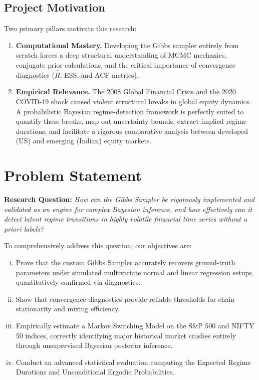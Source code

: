 \documentclass[12pt, a4paper]{article}
\begin{document}
\subsection{Project Motivation}
Two primary pillars motivate this research:
\begin{enumerate}
  \item \textbf{Computational Mastery.} Developing the Gibbs sampler entirely from scratch forces a deep structural understanding of MCMC mechanics, conjugate prior calculations, and the critical importance of convergence diagnostics ($\hat{R}$, ESS, and ACF metrics).
  \item \textbf{Empirical Relevance.} The 2008 Global Financial Crisis and the 2020 COVID-19 shock caused violent structural breaks in global equity dynamics. A probabilistic Bayesian regime-detection framework is perfectly suited to quantify these breaks, map out uncertainty bounds, extract implied regime durations, and facilitate a rigorous comparative analysis between developed (US) and emerging (Indian) equity markets.
\end{enumerate}


\section{Problem Statement}

\textbf{Research Question:} \emph{How can the Gibbs Sampler be rigorously implemented and validated as an engine for complex Bayesian inference, and how effectively can it detect latent regime transitions in highly volatile financial time series without a priori labels?}

To comprehensively address this question, our objectives are:
\begin{enumerate}[(i)]
  \item Prove that the custom Gibbs Sampler accurately recovers ground-truth parameters under simulated multivariate normal and linear regression setups, quantitatively confirmed via diagnostics.
  \item Show that convergence diagnostics provide reliable thresholds for chain stationarity and mixing efficiency.
  \item Empirically estimate a Markov Switching Model on the S\&P 500 and NIFTY 50 indices, correctly identifying major historical market crashes entirely through unsupervised Bayesian posterior inference.
  \item Conduct an advanced statistical evaluation computing the Expected Regime Durations and Unconditional Ergodic Probabilities.
\end{enumerate}
\end{document}
